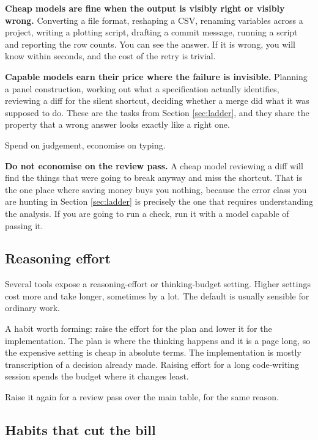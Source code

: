\documentclass[11pt,a4paper]{article}
\begin{document}
\textbf{Cheap models are fine when the output is visibly right or visibly wrong.}
Converting a file format, reshaping a CSV, renaming variables across a project,
writing a plotting script, drafting a commit message, running a script and
reporting the row counts. You can see the answer. If it is wrong, you will know
within seconds, and the cost of the retry is trivial.

\textbf{Capable models earn their price where the failure is invisible.} Planning
a panel construction, working out what a specification actually identifies,
reviewing a diff for the silent shortcut, deciding whether a merge did what it
was supposed to do. These are the tasks from Section \ref{sec:ladder}, and they
share the property that a wrong answer looks exactly like a right one.

Spend on judgement, economise on typing.

\begin{aside}
\textbf{Do not economise on the review pass.} A cheap model reviewing a diff will
find the things that were going to break anyway and miss the shortcut. That is
the one place where saving money buys you nothing, because the error class you
are hunting in Section \ref{sec:ladder} is precisely the one that requires
understanding the analysis. If you are going to run a check, run it with a model
capable of passing it.
\end{aside}

\subsection{Reasoning effort}

Several tools expose a reasoning-effort or thinking-budget setting. Higher
settings cost more and take longer, sometimes by a lot. The default is usually
sensible for ordinary work.

A habit worth forming: raise the effort for the plan and lower it for the
implementation. The plan is where the thinking happens and it is a page long, so
the expensive setting is cheap in absolute terms. The implementation is mostly
transcription of a decision already made. Raising effort for a long code-writing
session spends the budget where it changes least.

Raise it again for a review pass over the main table, for the same reason.

\subsection{Habits that cut the bill}
\end{document}

